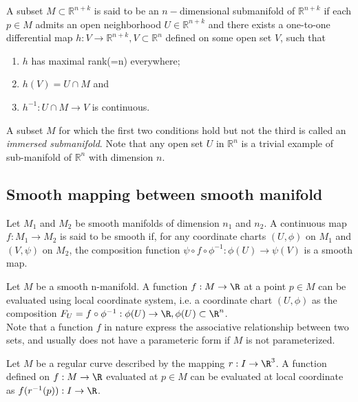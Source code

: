 \begin{refsection}
\begin{definition}\cite{walschap2015multivariable}
A subset $M \subset \mathbb{R}^{n+k}$ is said to be an $n-$dimensional submanifold of $\mathbb{R}^{n+k}$ if each $p\in M$ admits an open neighborhood $U \in \mathbb{R}^{n+k}$ and there exists a one-to-one differential map $h: V\rightarrow \mathbb{R}^{n+k}, V\subset \mathbb{R}^n $ defined on some open set $V$, such that
\begin{enumerate}
    \item $h$ has maximal rank(=n) everywhere;
    \item $h(V) = U\cap M$ and
    \item $h^{-1}: U\cap M \rightarrow V$ is continuous.
\end{enumerate}
A subset $M$ for which the first two conditions hold but not the third is called an \emph{immersed submanifold}. Note that any open set $U$ in $\mathbb{R}^n$ is a trivial example of sub-manifold of $\mathbb{R}^n$ with dimension $n$.
\end{definition}

\subsection{Smooth mapping between smooth manifold}
\begin{definition}
Let $M_1$ and $M_2$ be smooth manifolds of dimension $n_1$ and $n_2$. A continuous map $f:M_1\to M_2$ is said to be smooth if, for any coordinate charts $(U,\phi)$ on $M_1$ and $(V,\psi)$ on $M_2$, the composition function $\psi\circ f \circ \phi^{-1}: \phi(U)\to \psi(V)$ is a smooth map. 
\end{definition}


\begin{remark}
Let $M$ be a smooth n-manifold. A function $f:M\to \R$ at a point $p\in M$ can be evaluated using local coordinate system, i.e. a coordinate chart $(U,\phi)$ as the composition $F_U=f\circ \phi^{-1}: \phi(U)\to \R,\phi(U)\subset \R^n$.\\
Note that a function $f$ in nature express the associative relationship between two sets, and usually does not have a parameteric form if $M$ is not parameterized. 	
\end{remark}
\begin{mdframed}
\end{mdframed}

\begin{example}
Let $M$ be a regular curve described by the mapping $r: I \to \R^3$. A function defined on $f:M\to \R$ evaluated at $p\in M$ can be evaluated at local coordinate as $f(r^{-1}(p)):I\to \R$.
\end{example}



\end{refsection}
